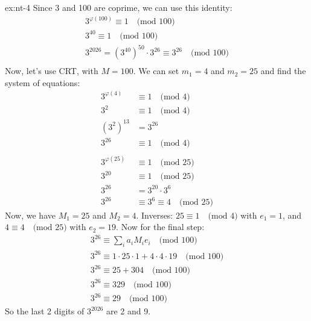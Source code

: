 \begin{solution}{ex:nt-4}
  Since 3 and 100 are coprime, we can use this identity:
  \[
    \begin{gathered}
      3^{\varphi (100)}\equiv 1 \quad \text{(mod 100)}\\
      3^{40} \equiv 1 \quad \text{(mod 100)}\\
      3^{2026}=(3^{40})^{50}\cdot 3^{26}\equiv 3^{26} \quad \text{(mod 100)}\\
    \end{gathered}
  \]
  Now, let's use CRT, with $M=100$. We can set $m_1=4$ and $m_2=25$ and find the system of equations:
  \[
    \begin{aligned}
      3^{\varphi(4)}&\equiv 1 \quad \text{(mod 4)}\\
      3^{2}&\equiv 1 \quad \text{(mod 4)}\\
      (3^{2})^{13} &= 3^{26}\\
      3^{26}&\equiv 1 \quad \text{(mod 4)}\\\\
      3^{\varphi (25)} &\equiv 1 \quad \text{(mod 25)}\\
      3^{20}&\equiv 1 \quad \text{(mod 25)}\\
      3^{26}&=3^{20}\cdot 3^6 \\
      3^{26}&\equiv 3^6 \equiv 4 \quad \text{(mod 25)}
    \end{aligned}
  \]
  Now, we have $M_1=25$ and $M_2=4$. Inverses: $25\equiv1\quad \text{(mod 4)}$ with $e_1=1$, and $4\equiv 4\quad \text{(mod 25)}$ with $e_2=19$. Now for the final step:
  \[
    \begin{gathered}
      3^{26}\equiv \sum_i a_i M_i e_i \quad \text{(mod 100)}\\
      3^{26}\equiv 1\cdot 25 \cdot 1 + 4\cdot 4 \cdot 19 \quad \text{(mod 100)}\\
      3^{26}\equiv 25 + 304 \quad \text{(mod 100)}\\
      3^{26} \equiv 329 \quad \text{(mod 100)}\\
      3^{26} \equiv 29 \quad \text{(mod 100)}
    \end{gathered}
  \]
  So the last 2 digits of $3^{2026}$ are 2 and 9.
\end{solution}
